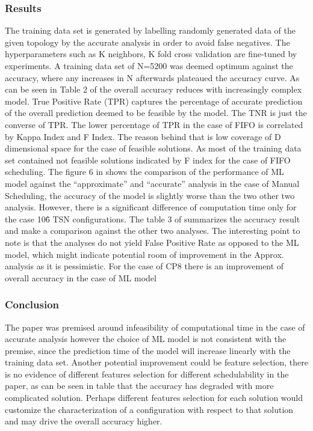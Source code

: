 \documentclass[journal,12pt,twocolumn]{IEEEtran}
\begin{document}
\subsubsection{Results}
The training data set is generated by labelling randomly generated data of the given topology by the accurate analysis in order to avoid false negatives. The hyperparameters such as K neighbors, K fold cross validation are fine-tuned by experiments.
A training data set of N=5200 was deemed optimum against the accuracy, where any increases in N afterwards plateaued the accuracy curve.
As can be seen in Table 2 of \cite{ML} the overall accuracy reduces with increasingly complex model. True Positive Rate (TPR) captures the percentage of accurate prediction of the overall prediction deemed to be feasible by the model. The TNR is just the converse of TPR. The lower percentage of TPR in the case of FIFO is correlated by Kappa Index and F Index. The reason behind that is low coverage of D dimensional space for the case of feasible solutions. As most of the training data set contained not feasible solutions indicated by F index for the case of FIFO scheduling.
The figure 6 in \cite{ML} shows the comparison of the performance of ML model against the “approximate” and “accurate” analysis in the case of Manual Scheduling, the accuracy of the model is slightly worse than the two other two analysis. However, there is a significant difference of computation time only for the case 10\^6 TSN configurations.
The table 3 of \cite{ML} summarizes the accuracy result and make a comparison against the other two analyses. The interesting point to note is that the analyses do not yield False Positive Rate as opposed to the ML model, which might indicate potential room of improvement in the Approx. analysis as it is pessimistic. For the case of CP8 there is an improvement of overall accuracy in the case of ML model
\subsubsection{Conclusion}
The paper was premised around infeasibility of computational time in the case of accurate analysis however the choice of ML model is not consistent with the premise, since the prediction time of the model will increase linearly with the training data set.
 Another potential improvement could be feature selection, there is no evidence of different features selection for different schedulability in the paper, as can be seen in table that the accuracy has degraded with more complicated solution. Perhaps different features selection for each solution would customize the characterization of a configuration with respect to that solution and may drive the overall accuracy higher.
\end{document}
